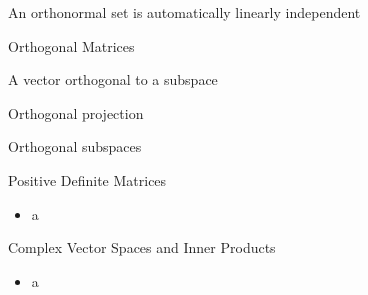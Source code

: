 \documentclass{beamer}
\begin{document}
\begin{frame}{An orthonormal set is automatically linearly independent}


\end{frame}

\begin{frame}{Orthogonal Matrices}


\end{frame}

\begin{frame}{A vector orthogonal to a subspace}


\end{frame}

\begin{frame}{Orthogonal projection}


\end{frame}

\begin{frame}{Orthogonal subspaces}


\end{frame}

\begin{frame}{Positive Definite Matrices}

\begin{itemize}
\item a
\end{itemize}
\end{frame}

\begin{frame}{Complex Vector Spaces and Inner Products}

\begin{itemize}
\item a
\end{itemize}
\end{frame}


\end{document}
